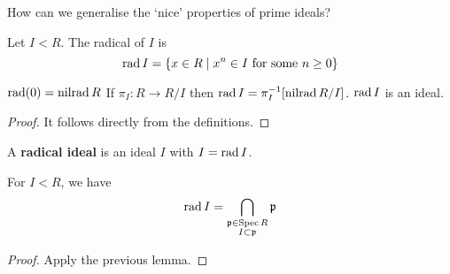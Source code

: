 How can we generalise the `nice' properties of prime ideals?

\begin{defn}[0.13]
	Let $I<R$.
	The radical of $I$ is
	\[\operatorname{rad} I = \{x \in R \mid x^n \in I \text{ for some } n \geq 0\}\]
\end{defn}

\begin{lem}[0.14]
  	\leavevmode
	\begin{enum}
		\io $\operatorname{rad} (0) = \operatorname{nilrad} R$
		\io If $\pi_I: R \to R/I$ then $\operatorname{rad} I = \pi_I^{-1}[\operatorname{nilrad} R/I]$.
		\io $\operatorname{rad} I$ is an ideal.
	\end{enum}
\end{lem}

\begin{proof}
	It follows directly from the definitions.
\end{proof}

\begin{defn}[0.15]
	A \textbf{radical ideal} is an ideal $I$ with $I = \operatorname{rad} I$.
\end{defn}

\begin{lem}[0.16]
	For $I<R$, we have
	\[\operatorname{rad} I = \bigcap_{\substack{\mathfrak{p} \in \operatorname{Spec} R \\ I \subset \mathfrak{p}}} \mathfrak{p}\]
\end{lem}

\begin{proof}
	Apply the previous lemma.
\end{proof}
